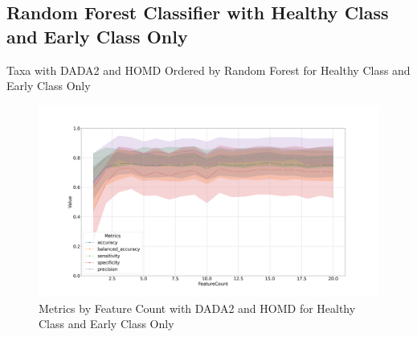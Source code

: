 \documentclass[a4paper]{article}
\begin{document}
        \subsection{Random Forest Classifier with Healthy Class and Early Class Only}

            \begin{table}[p]
                \centering
                \caption{Taxa with DADA2 and HOMD Ordered by Random Forest for Healthy Class and Early Class Only}
                \label{tb:RF-HEonly-DADA2-homd}

            \end{table}

            \begin{figure}[p]
                \centering
                \includegraphics[width=0.7 \linewidth]{figures/RandomForest/HE.DADA2.homd/metrics.png}
                \caption{Metrics by Feature Count with DADA2 and HOMD for Healthy Class and Early Class Only}
                \label{fig:RF-HEonly-metrics-DADA2-homd}
            \end{figure}
\end{document}
